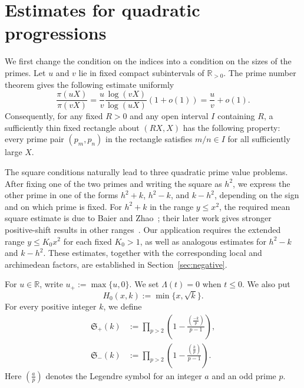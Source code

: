 \documentclass[12pt,reqno]{amsart}
\numberwithin{equation}{section}
\theoremstyle{plain}
\theoremstyle{remark}
\begin{document}
\section{Estimates for quadratic progressions}\label{sec:input}

We first change the condition on the indices into a condition on the
sizes of the primes.  Let $u$ and $v$ lie in fixed compact subintervals
of $\mathbb R_{>0}$.  The prime number theorem gives the following
estimate uniformly
\begin{equation}\label{index-transfer}
 \frac{\pi(uX)}{\pi(vX)}
 =\frac{u}{v}\frac{\log(vX)}{\log(uX)}(1+o(1))
 =\frac{u}{v}+o(1).
\end{equation}
Consequently, for any fixed $R>0$ and any open interval $I$
containing $R$, a sufficiently thin fixed rectangle about
$(RX,X)$ has the following property: every prime pair
$(p_m,p_n)$ in the rectangle satisfies $m/n\in I$ for all
sufficiently large $X$.

The square conditions naturally lead to three quadratic prime value problems. After fixing one of the two primes and writing the square as $h^2$,
we express the other prime in one of the forms $h^2+k$, $h^2-k$,
and $k-h^2$, depending on the sign and on which prime is fixed.
For \(h^2+k\) in the range \(y\leq x^2\), the required mean square estimate is due to Baier and Zhao~\cite{BaierZhao2007}; their later work gives stronger positive-shift results in other ranges~\cite{BaierZhao2009}. Our application requires the extended range \(y\leq K_0x^2\) for each fixed \(K_0>1\), as well as analogous estimates for \(h^2-k\) and \(k-h^2\). These estimates, together with the corresponding local and archimedean factors, are established in Section~\ref{sec:negative}.



For $u\in\mathbb R$, write $u_+:=\max\{u,0\}$.  We set
$\Lambda(t)=0$ when $t\leq0$.  We also put
\begin{equation}\label{H0-definition}
 H_0(x,k):=\min\{x,\sqrt{k}\}.
\end{equation}
For every positive integer $k$, we define
\begin{align}
 \mathfrak S_+(k)
  &:=\prod_{p>2}\left(1-\frac{\left(\frac{-k}{p}\right)}{p-1}\right),
  \label{positive-series}\\
 \mathfrak S_-(k)
  &:=\prod_{p>2}\left(1-\frac{\left(\frac{k}{p}\right)}{p-1}\right).
  \label{negative-series}
\end{align}
Here $\left(\frac{a}{p}\right)$ denotes the Legendre symbol
for an integer $a$ and an odd prime $p$.
\end{document}
